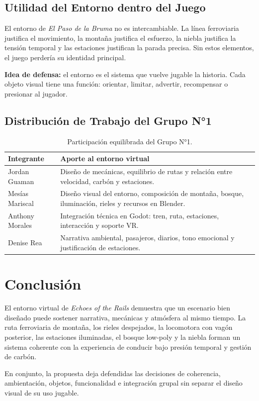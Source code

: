 \documentclass[11pt,letterpaper]{article}
\begin{document}
\subsection{Utilidad del Entorno dentro del Juego}

El entorno de \textit{El Paso de la Bruma} no es intercambiable. La línea ferroviaria justifica el movimiento, la montaña justifica el esfuerzo, la niebla justifica la tensión temporal y las estaciones justifican la parada precisa. Sin estos elementos, el juego perdería su identidad principal.

\begin{infoCard}
\textbf{Idea de defensa:} el entorno es el sistema que vuelve jugable la historia. Cada objeto visual tiene una función: orientar, limitar, advertir, recompensar o presionar al jugador.
\end{infoCard}

\subsection{Distribución de Trabajo del Grupo N°1}

\begin{table}[H]
\centering
\begin{tabularx}{\textwidth}{@{}L{3.8cm}Y@{}}
\toprule
\textbf{Integrante} & \textbf{Aporte al entorno virtual}\\
\midrule
Jordan Guaman & Diseño de mecánicas, equilibrio de rutas y relación entre velocidad, carbón y estaciones.\\
Mesías Mariscal & Diseño visual del entorno, composición de montaña, bosque, iluminación, rieles y recursos en Blender.\\
Anthony Morales & Integración técnica en Godot: tren, ruta, estaciones, interacción y soporte VR.\\
Denise Rea & Narrativa ambiental, pasajeros, diarios, tono emocional y justificación de estaciones.\\
\bottomrule
\end{tabularx}
\caption{Participación equilibrada del Grupo N°1.}
\end{table}

\section*{Conclusión}

El entorno virtual de \textit{Echoes of the Rails} demuestra que un escenario bien diseñado puede sostener narrativa, mecánicas y atmósfera al mismo tiempo. La ruta ferroviaria de montaña, los rieles despejados, la locomotora con vagón posterior, las estaciones iluminadas, el bosque low-poly y la niebla forman un sistema coherente con la experiencia de conducir bajo presión temporal y gestión de carbón.

En conjunto, la propuesta deja defendidas las decisiones de coherencia, ambientación, objetos, funcionalidad e integración grupal sin separar el diseño visual de su uso jugable.
\end{document}
